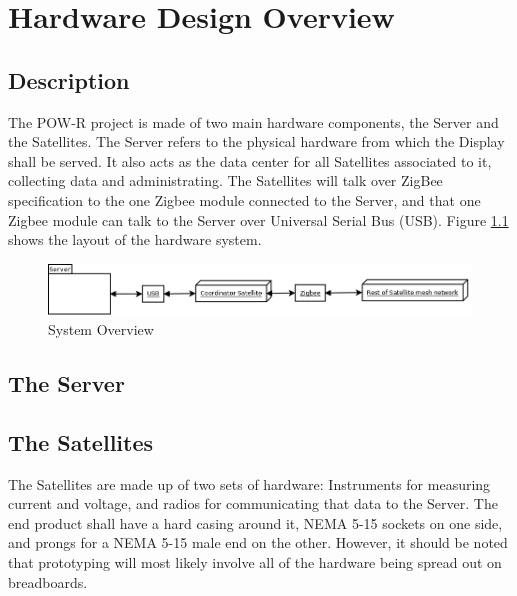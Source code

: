 
\chapter{Hardware Design Overview}

\section{Description}

The POW-R project is made of two main hardware components, the Server and the Satellites. The Server refers to the physical hardware from which the Display shall be served. It also acts as the data center for all Satellites associated to it, collecting data and administrating. The Satellites will talk over ZigBee specification to the one Zigbee module connected to the Server, and that one Zigbee module can talk to the Server over Universal Serial Bus (USB). Figure \ref{SystemOverview} shows the layout of the hardware system.


\begin{figure}[H]
\centering
\includegraphics[scale=0.3]{Hardware/images/SystemOverview.png}
\caption{System Overview}
\label{SystemOverview}
\end{figure}

\section{The Server}


%

\section{The Satellites}
The Satellites are made up of two sets of hardware: Instruments for measuring current and voltage, and radios for communicating that data to the Server. The end product shall have a hard casing around it, NEMA 5-15 sockets on one side, and prongs for a NEMA 5-15 male end on the other. However, it should be noted that prototyping will most likely involve all of the hardware being spread out on breadboards.


